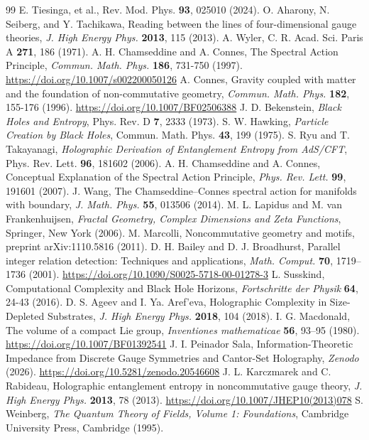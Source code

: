 \documentclass[12pt,a4paper]{article}
\begin{document}

\begin{thebibliography}{99}
 E. Tiesinga, et al., Rev. Mod. Phys. \textbf{93}, 025010 (2024).
 O. Aharony, N. Seiberg, and Y. Tachikawa, Reading between the lines of four-dimensional gauge theories, \textit{J. High Energy Phys.} \textbf{2013}, 115 (2013).
 A. Wyler, C. R. Acad. Sci. Paris A \textbf{271}, 186 (1971).
 A. H. Chamseddine and A. Connes, The Spectral Action Principle, \textit{Commun. Math. Phys.} \textbf{186}, 731-750 (1997). \url{https://doi.org/10.1007/s002200050126}
 A. Connes, Gravity coupled with matter and the foundation of non-commutative geometry, \textit{Commun. Math. Phys.} \textbf{182}, 155-176 (1996). \url{https://doi.org/10.1007/BF02506388}
 J. D. Bekenstein, \textit{Black Holes and Entropy}, Phys. Rev. D \textbf{7}, 2333 (1973).
 S. W. Hawking, \textit{Particle Creation by Black Holes}, Commun. Math. Phys. \textbf{43}, 199 (1975).
 S. Ryu and T. Takayanagi, \textit{Holographic Derivation of Entanglement Entropy from AdS/CFT}, Phys. Rev. Lett. \textbf{96}, 181602 (2006).
 A. H. Chamseddine and A. Connes, Conceptual Explanation of the Spectral Action Principle, \textit{Phys. Rev. Lett.} \textbf{99}, 191601 (2007).
 J. Wang, The Chamseddine–Connes spectral action for manifolds with boundary, \textit{J. Math. Phys.} \textbf{55}, 013506 (2014).
 M. L. Lapidus and M. van Frankenhuijsen, \textit{Fractal Geometry, Complex Dimensions and Zeta Functions}, Springer, New York (2006).
 M. Marcolli, Noncommutative geometry and motifs, preprint arXiv:1110.5816 (2011).
 D. H. Bailey and D. J. Broadhurst, Parallel integer relation detection: Techniques and applications, \textit{Math. Comput.} \textbf{70}, 1719--1736 (2001). \url{https://doi.org/10.1090/S0025-5718-00-01278-3}
 L. Susskind, Computational Complexity and Black Hole Horizons, \textit{Fortschritte der Physik} \textbf{64}, 24-43 (2016).
 D. S. Ageev and I. Ya. Aref'eva, Holographic Complexity in Size-Depleted Substrates, \textit{J. High Energy Phys.} \textbf{2018}, 104 (2018).
 I. G. Macdonald, The volume of a compact Lie group, \textit{Inventiones mathematicae} \textbf{56}, 93--95 (1980). \url{https://doi.org/10.1007/BF01392541}
 J. I. Peinador Sala, Information-Theoretic Impedance from Discrete Gauge Symmetries and Cantor-Set Holography, \textit{Zenodo} (2026). \url{https://doi.org/10.5281/zenodo.20546608}
 J. L. Karczmarek and C. Rabideau, Holographic entanglement entropy in noncommutative gauge theory, \textit{J. High Energy Phys.} \textbf{2013}, 78 (2013). \url{https://doi.org/10.1007/JHEP10(2013)078}
 S. Weinberg, \textit{The Quantum Theory of Fields, Volume 1: Foundations}, Cambridge University Press, Cambridge (1995).
\end{thebibliography}
\end{document}

